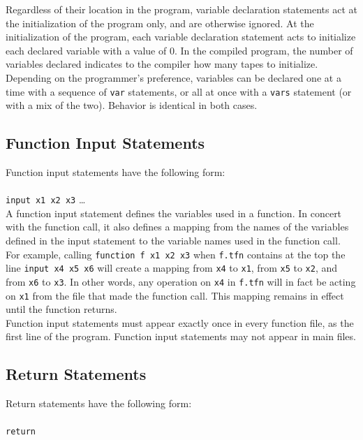 \documentclass[11pt]{report}
\begin{document}
Regardless of their location in the program, variable declaration statements act at the initialization of the program only, and are otherwise ignored. At the initialization of the program, each variable declaration statement acts to initialize each declared variable with a value of 0. In the compiled program, the number of variables declared indicates to the compiler how many tapes to initialize. \\

Depending on the programmer's preference, variables can be declared one at a time with a sequence of \texttt{var} statements, or all at once with a \texttt{vars} statement (or with a mix of the two). Behavior is identical in both cases.

\subsection{Function Input Statements}

Function input statements have the following form: \\ \\
\texttt{input x1 x2 x3} \dots \\

A function input statement defines the variables used in a function. In concert with the function call, it also defines a mapping from the names of the variables defined in the input statement to the variable names used in the function call. For example, calling \texttt{function f x1 x2 x3} when \texttt{f.tfn} contains at the top the line \texttt{input x4 x5 x6} will create a mapping from \texttt{x4} to \texttt{x1}, from \texttt{x5} to \texttt{x2}, and from \texttt{x6} to \texttt{x3}. In other words, any operation on \texttt{x4} in \texttt{f.tfn} will in fact be acting on \texttt{x1} from the file that made the function call. This mapping remains in effect until the function returns. \\

Function input statements must appear exactly once in every function file, as the first line of the program. Function input statements may not appear in main files.

\subsection{Return Statements}

Return statements have the following form: \\ \\
\texttt{return} \\
\end{document}
